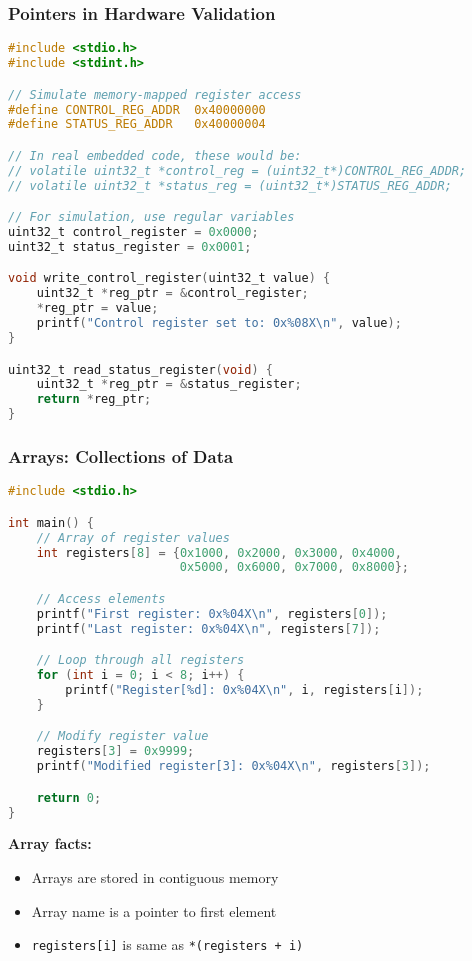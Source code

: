 \documentclass{beamer}
\begin{document}
\begin{frame}[fragile]
\frametitle{Pointers in Hardware Validation}
\begin{lstlisting}[language=C, basicstyle=\fontsize{6}{7}\selectfont\ttfamily]
#include <stdio.h>
#include <stdint.h>

// Simulate memory-mapped register access
#define CONTROL_REG_ADDR  0x40000000
#define STATUS_REG_ADDR   0x40000004

// In real embedded code, these would be:
// volatile uint32_t *control_reg = (uint32_t*)CONTROL_REG_ADDR;
// volatile uint32_t *status_reg = (uint32_t*)STATUS_REG_ADDR;

// For simulation, use regular variables
uint32_t control_register = 0x0000;
uint32_t status_register = 0x0001;

void write_control_register(uint32_t value) {
    uint32_t *reg_ptr = &control_register;
    *reg_ptr = value;
    printf("Control register set to: 0x%08X\n", value);
}

uint32_t read_status_register(void) {
    uint32_t *reg_ptr = &status_register;
    return *reg_ptr;
}
\end{lstlisting}
\end{frame}

\begin{frame}[fragile]
\frametitle{Arrays: Collections of Data}
\begin{lstlisting}[language=C, basicstyle=\fontsize{6}{6}\selectfont\ttfamily]
#include <stdio.h>

int main() {
    // Array of register values
    int registers[8] = {0x1000, 0x2000, 0x3000, 0x4000,
                        0x5000, 0x6000, 0x7000, 0x8000};

    // Access elements
    printf("First register: 0x%04X\n", registers[0]);
    printf("Last register: 0x%04X\n", registers[7]);

    // Loop through all registers
    for (int i = 0; i < 8; i++) {
        printf("Register[%d]: 0x%04X\n", i, registers[i]);
    }

    // Modify register value
    registers[3] = 0x9999;
    printf("Modified register[3]: 0x%04X\n", registers[3]);

    return 0;
}
\end{lstlisting}

\textbf{Array facts:}
\begin{itemize}
    \item Arrays are stored in contiguous memory
    \item Array name is a pointer to first element
    \item \texttt{registers[i]} is same as \texttt{*(registers + i)}
\end{itemize}
\end{frame}
\end{document}
